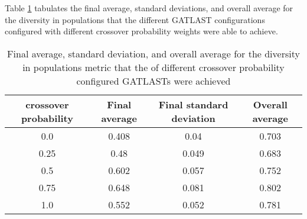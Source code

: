 Table \ref{tab:HP:GA:crossoverProp:diversity in populations} tabulates the final average, standard deviations, and overall average for the diversity in populations that the different GATLAST configurations configured with different crossover probability weights were able to achieve.
\begin{table}[tbh!]
\centering
\begin{adjustbox}{trim=0cm 0cm 0cm 0cm, clip=true}
\begin{tabular}{|c|c|c|c|}
\hline
crossover probability & Final average & Final standard deviation & Overall average\\
\hline
0.0 & 0.408 & 0.04 & 0.703\\\hline
0.25 & 0.48 & 0.049 & 0.683\\\hline
0.5 & 0.602 & 0.057 & 0.752\\\hline
0.75 & 0.648 & 0.081 & 0.802\\\hline
1.0 & 0.552 & 0.052 & 0.781\\\hline
\end{tabular}
\end{adjustbox}
\caption{Final average, standard deviation, and overall average for the diversity in populations metric that the of different crossover probability configured GATLASTs were achieved}
\label{tab:HP:GA:crossoverProp:diversity in populations}
\end{table}